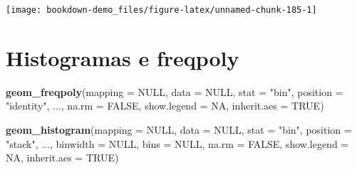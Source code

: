 \documentclass[]{book}
\newenvironment{Shaded}{\begin{snugshade}}{\end{snugshade}}
\newcommand{\KeywordTok}[1]{\textcolor[rgb]{0.13,0.29,0.53}{\textbf{#1}}}
\newcommand{\DataTypeTok}[1]{\textcolor[rgb]{0.13,0.29,0.53}{#1}}
\newcommand{\DecValTok}[1]{\textcolor[rgb]{0.00,0.00,0.81}{#1}}
\newcommand{\StringTok}[1]{\textcolor[rgb]{0.31,0.60,0.02}{#1}}
\newcommand{\OtherTok}[1]{\textcolor[rgb]{0.56,0.35,0.01}{#1}}
\newcommand{\OperatorTok}[1]{\textcolor[rgb]{0.81,0.36,0.00}{\textbf{#1}}}
\newcommand{\NormalTok}[1]{#1}
\begin{document}
\begin{Shaded}
\end{Shaded}

\begin{center}\texttt{[image: bookdown-demo\_files/figure-latex/unnamed-chunk-185-1]} \end{center}

\section{Histogramas e freqpoly}\label{histogramas-e-freqpoly}

\begin{Shaded}
\begin{Highlighting}[]
\KeywordTok{geom_freqpoly}\NormalTok{(}\DataTypeTok{mapping =} \OtherTok{NULL}\NormalTok{, }\DataTypeTok{data =} \OtherTok{NULL}\NormalTok{, }\DataTypeTok{stat =} \StringTok{"bin"}\NormalTok{,}
  \DataTypeTok{position =} \StringTok{"identity"}\NormalTok{, ..., }\DataTypeTok{na.rm =} \OtherTok{FALSE}\NormalTok{, }\DataTypeTok{show.legend =} \OtherTok{NA}\NormalTok{,}
  \DataTypeTok{inherit.aes =} \OtherTok{TRUE}\NormalTok{)}

\KeywordTok{geom_histogram}\NormalTok{(}\DataTypeTok{mapping =} \OtherTok{NULL}\NormalTok{, }\DataTypeTok{data =} \OtherTok{NULL}\NormalTok{, }\DataTypeTok{stat =} \StringTok{"bin"}\NormalTok{,}
  \DataTypeTok{position =} \StringTok{"stack"}\NormalTok{, ..., }\DataTypeTok{binwidth =} \OtherTok{NULL}\NormalTok{, }\DataTypeTok{bins =} \OtherTok{NULL}\NormalTok{, }\DataTypeTok{na.rm =} \OtherTok{FALSE}\NormalTok{,}
  \DataTypeTok{show.legend =} \OtherTok{NA}\NormalTok{, }\DataTypeTok{inherit.aes =} \OtherTok{TRUE}\NormalTok{)}
\end{Highlighting}
\end{Shaded}
\end{document}
